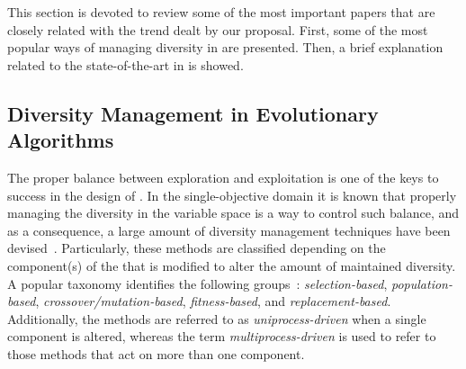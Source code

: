 This section is devoted to review some of the most important papers that are closely related with the trend dealt by our proposal.
%
First, some of the most popular ways of managing diversity in \EAS{} are presented.
%
Then, a brief explanation related to the state-of-the-art in \MOEAS{} is showed.

\subsection{Diversity Management in Evolutionary Algorithms}

The proper balance between exploration and exploitation is one of the keys to success in the design of \EAS{}.
%
In the single-objective domain it is known that properly managing the diversity in the variable space is a way to control such balance,
and as a consequence, a large amount of diversity management techniques have been devised~\cite{Mohan:14}.
%
Particularly, these methods are classified depending on the component(s) of the \EA{} that is modified to alter the 
amount of maintained diversity.
%
A popular taxonomy identifies the following groups~\cite{Joel:Crepinsek}: \textit{selection-based}, \textit{population-based}, 
\textit{crossover/mutation-based}, \textit{fitness-based}, and \textit{replacement-based}.
%
Additionally, the methods are referred to as \textit{uniprocess-driven} when a single component is altered, whereas the term
\textit{multiprocess-driven} is used to refer to those methods that act on more than one component.

